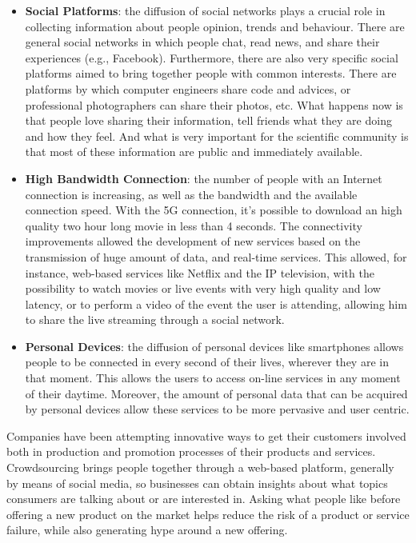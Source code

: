 \begin{itemize}
	\item \textbf{Social Platforms}: the diffusion of social networks plays a crucial role in collecting information about people opinion, trends and behaviour. There are general social networks in which people chat, read news, and share their experiences (e.g., Facebook). Furthermore, there are also very specific social platforms aimed to bring together people with common interests. There are platforms by which computer engineers share code and advices, or professional photographers can share their photos, etc. What happens now is that people love sharing their information, tell friends what they are doing and how they feel. And what is very important for the scientific community is that most of these information are public and immediately available.
	\item \textbf{High Bandwidth Connection}: the number of people with an Internet connection is increasing, as well as the bandwidth and the available connection speed. With the 5G connection, it's possible to download an high quality two hour long movie in less than 4 seconds. 
	The connectivity improvements allowed the development of new services based on the transmission of huge amount of data, and real-time services. This allowed, for instance, web-based services like Netflix and the IP television, with the possibility to watch movies or live events with very high quality and low latency, or to perform a video of the event the user is attending, allowing him to share the live streaming through a social network.
	\item \textbf{Personal Devices}: the diffusion of personal devices like smartphones allows people to be connected in every second of their lives, wherever they are in that moment. This allows the users to access on-line services in any moment of their daytime. Moreover, the amount of personal data that can be acquired by personal devices allow these services to be more pervasive and user centric.%
\end{itemize}

Companies have been attempting innovative ways to get their customers involved both in production and promotion processes of their products and services. Crowdsourcing brings people together through a web-based platform, %
generally by means of social media, so businesses can obtain insights about what topics consumers are talking about or are interested in.
Asking what people like before offering a new product on the market helps reduce the risk of a product or service failure, while also generating hype around a new offering.

